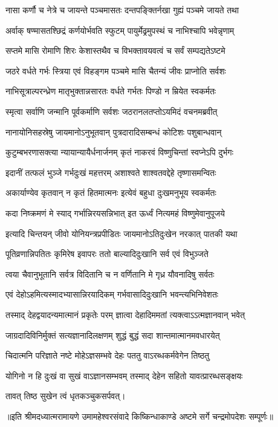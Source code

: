 \twolineshloka
{नासा कर्णौ च नेत्रे च जायन्ते पञ्चमासतः}
{दन्तपङ्क्तिर्नखा गुह्यं पञ्चमे जायते तथा} %

\twolineshloka
{अर्वाक् षण्मासतश्छिद्रं कर्णयोर्भवति स्फुटम्}
{पायुर्मेढ्रमुपस्थं च नाभिश्चापि भवेन्नृणाम्} %

\twolineshloka
{सप्तमे मासि रोमाणि शिरः केशास्तथैव च}
{विभक्तावयवत्वं च सर्वं सम्पद्यतेऽष्टमे} %

\twolineshloka
{जठरे वर्धते गर्भः स्त्रिया एवं विहङ्गम}
{पञ्चमे मासि चैतन्यं जीवः प्राप्नोति सर्वशः} %

\twolineshloka
{नाभिसूत्राल्परन्ध्रेण मातृभुक्तान्नसारतः}
{वर्धते गर्भतः पिण्डो न म्रियेत स्वकर्मतः} %

\twolineshloka
{स्मृत्वा सर्वाणि जन्मानि पूर्वकर्माणि सर्वशः}
{जठरानलतप्तोऽयमिदं वचनमब्रवीत्} %

\twolineshloka
{नानायोनिसहस्रेषु जायमानोऽनुभूतवान्}
{पुत्रदारादिसम्बन्धं कोटिशः पशुबान्धवान्} %

\twolineshloka
{कुटुम्बभरणासक्त्या न्यायान्यायैर्धनार्जनम्}
{कृतं नाकरवं विष्णुचिन्तां स्वप्नेऽपि दुर्भगः} %

\twolineshloka
{इदानीं तत्फलं भुञ्जे गर्भदुःखं महत्तरम्}
{अशाश्वते शाश्वतवद्देहे तृष्णासमन्वितः} %

\twolineshloka
{अकार्याण्येव कृतवान् न कृतं हितमात्मनः}
{इत्येवं बहुधा दुःखमनुभूय स्वकर्मतः} %

\twolineshloka
{कदा निष्क्रमणं मे स्याद् गर्भान्निरयसन्निभात्}
{इत ऊर्ध्वं नित्यमहं विष्णुमेवानुपूजये} %

\twolineshloka
{इत्यादि चिन्तयन् जीवो योनियन्त्रप्रपीडितः}
{जायमानोऽतिदुःखेन नरकात् पातकी यथा} %

\twolineshloka
{पूतिव्रणान्निपतितः कृमिरेष इवापरः}
{ततो बाल्यादिदुःखानि सर्व एवं विभुञ्जते} %

\twolineshloka
{त्वया चैवानुभूतानि सर्वत्र विदितानि च}
{न वर्णितानि मे गृध्र यौवनादिषु सर्वतः} %

\twolineshloka
{एवं देहोऽहमित्यस्मादभ्यासान्निरयादिकम्}
{गर्भवासादिदुःखानि भवन्त्यभिनिवेशतः} %

\twolineshloka
{तस्माद् देहद्वयादन्यमात्मानं प्रकृतेः परम्}
{ज्ञात्वा देहादिममतां त्यक्त्वाऽऽत्मज्ञानवान् भवेत्} %

\twolineshloka
{जाग्रदादिविनिर्मुक्तं सत्यज्ञानादिलक्षणम्}
{शुद्धं बुद्धं सदा शान्तमात्मानमवधारयेत्} %

\twolineshloka
{चिदात्मनि परिज्ञाते नष्टे मोहेऽज्ञसम्भवे}
{देहः पततु वाऽरब्धकर्मवेगेन तिष्ठतु} %

\twolineshloka
{योगिनो न हि दुःखं वा सुखं वाऽज्ञानसम्भवम्}
{तस्माद् देहेन सहितो यावत्प्रारब्धसङ्क्षयः} %

{तावत् तिष्ठ सुखेन त्वं धृतकञ्चुकसर्पवत्।}

{॥इति श्रीमदध्यात्मरामायणे उमामहेश्वरसंवादे किष्किन्धाकाण्डे
अष्टमे सर्गे चन्द्रमोपदेशः सम्पूर्णः॥}

